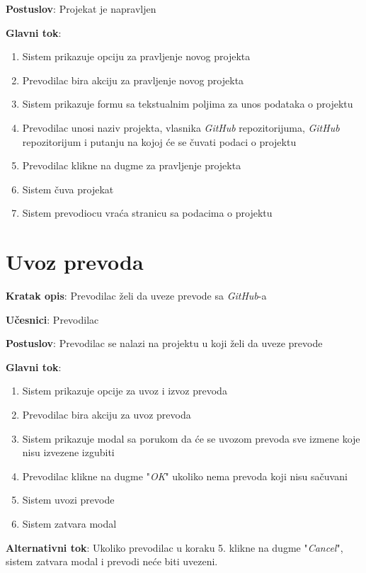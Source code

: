 \textbf{Postuslov}: Projekat je napravljen

\textbf{Glavni tok}:
\begin{enumerate}
    \item Sistem prikazuje opciju za pravljenje novog projekta
    \item Prevodilac bira akciju za pravljenje novog projekta
    \item Sistem prikazuje formu sa tekstualnim poljima za unos podataka o projektu
    \item Prevodilac unosi naziv projekta, vlasnika \textit{GitHub} repozitorijuma, 
    \textit{GitHub} repozitorijum i putanju na kojoj će se čuvati podaci o projektu
    \item Prevodilac klikne na dugme za pravljenje projekta
    \item Sistem čuva projekat
    \item Sistem prevodiocu vraća stranicu sa podacima o projektu
\end{enumerate}


\section{Uvoz prevoda}

\textbf{Kratak opis}: Prevodilac želi da uveze prevode sa \textit{GitHub}-a

\textbf{Učesnici}: Prevodilac

\textbf{Postuslov}: Prevodilac se nalazi na projektu u koji želi da uveze prevode

\textbf{Glavni tok}:
\begin{enumerate}
    \item Sistem prikazuje opcije za uvoz i izvoz prevoda
    \item Prevodilac bira akciju za uvoz prevoda
    \item Sistem prikazuje modal sa porukom da će se uvozom prevoda sve 
    izmene koje nisu izvezene izgubiti
    \item Prevodilac klikne na dugme "\textit{OK}" ukoliko nema prevoda koji nisu sačuvani
    \item Sistem uvozi prevode
    \item Sistem zatvara modal
\end{enumerate}

\textbf{Alternativni tok}: Ukoliko prevodilac u koraku 5. klikne na dugme "\textit{Cancel}", 
sistem zatvara modal i prevodi neće biti uvezeni.


